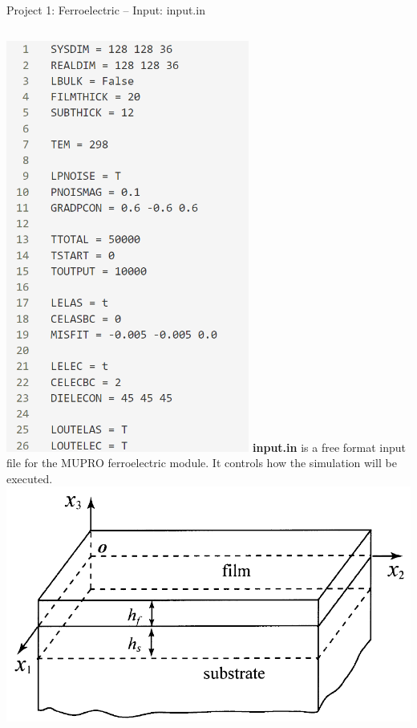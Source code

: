 \documentclass[11pt,aspectratio=169]{beamer}
\begin{document}
\renewcommand\fnl{}
\begin{frame}[fragile]{Project 1: Ferroelectric -- Input: input.in}
\begin{columns}
\centering
\vskip 0.5cm
\includegraphics[width=0.6\textwidth]{img/ferro_input.png}
\justify
{\bf input.in} is a free format input file for the MUPRO ferroelectric module. It controls how the simulation will be executed. 
\includegraphics[width=\textwidth]{img/ferro_bc.png}
\end{columns}
\end{frame}
\end{document}
